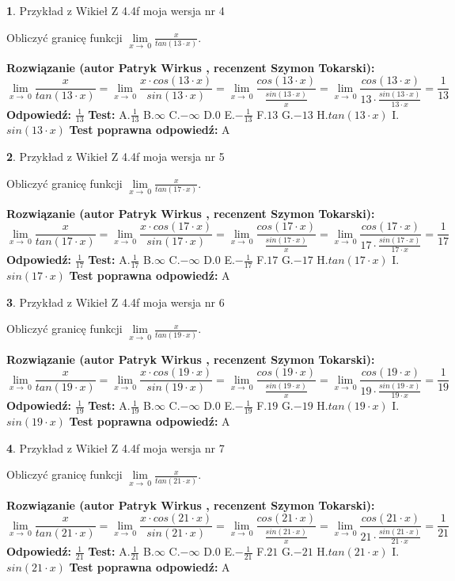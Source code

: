 \documentclass[12pt, a4paper]{article}
\theoremstyle{definition} %
\newtheorem{zad}{}
\newcommand{\zadStart}[1]{\begin{zad}#1\newline}
\newcommand{\zadStop}{\end{zad}}
\newcommand{\rozwStart}[2]{\noindent \textbf{Rozwiązanie (autor #1 , recenzent #2): }\newline}
\newcommand{\rozwStop}{\newline}
\newcommand{\odpStart}{\noindent \textbf{Odpowiedź:}\newline}
\newcommand{\odpStop}{\newline}
\newcommand{\testStart}{\noindent \textbf{Test:}\newline}
\newcommand{\testStop}{\newline}
\newcommand{\kluczStart}{\noindent \textbf{Test poprawna odpowiedź:}\newline}
\newcommand{\kluczStop}{\newline}
\begin{document}
\zadStart{Przykład z Wikieł Z 4.4f moja wersja nr 4}


Obliczyć granicę funkcji $\lim\limits_{x\to\ 0}\frac{x}{tan(13 \cdot x)}$.
\zadStop
\rozwStart{Patryk Wirkus}{Szymon Tokarski}
$$\lim\limits_{x\to\ 0}\frac{x}{tan(13 \cdot x)}=\lim\limits_{x\to\ 0}\frac{x \cdot cos(13 \cdot x)}{sin(13 \cdot x)}=\lim\limits_{x\to\ 0}\frac{cos(13 \cdot x)}{\frac{sin(13 \cdot x)}{x}}=\lim\limits_{x\to\ 0}\frac{cos(13 \cdot x)}{13 \cdot \frac{sin(13 \cdot x)}{13 \cdot x}} = \frac{1}{13}$$
\rozwStop
\odpStart
$\frac{1}{13}$
\odpStop
\testStart
A.$\frac{1}{13}$
B.$\infty$
C.$-\infty$
D.$0$
E.$-\frac{1}{13}$
F.$13$
G.$-13$
H.$tan(13 \cdot x)$
I.$sin(13 \cdot x)$
\testStop
\kluczStart
A
\kluczStop



\zadStart{Przykład z Wikieł Z 4.4f moja wersja nr 5}


Obliczyć granicę funkcji $\lim\limits_{x\to\ 0}\frac{x}{tan(17 \cdot x)}$.
\zadStop
\rozwStart{Patryk Wirkus}{Szymon Tokarski}
$$\lim\limits_{x\to\ 0}\frac{x}{tan(17 \cdot x)}=\lim\limits_{x\to\ 0}\frac{x \cdot cos(17 \cdot x)}{sin(17 \cdot x)}=\lim\limits_{x\to\ 0}\frac{cos(17 \cdot x)}{\frac{sin(17 \cdot x)}{x}}=\lim\limits_{x\to\ 0}\frac{cos(17 \cdot x)}{17 \cdot \frac{sin(17 \cdot x)}{17 \cdot x}} = \frac{1}{17}$$
\rozwStop
\odpStart
$\frac{1}{17}$
\odpStop
\testStart
A.$\frac{1}{17}$
B.$\infty$
C.$-\infty$
D.$0$
E.$-\frac{1}{17}$
F.$17$
G.$-17$
H.$tan(17 \cdot x)$
I.$sin(17 \cdot x)$
\testStop
\kluczStart
A
\kluczStop



\zadStart{Przykład z Wikieł Z 4.4f moja wersja nr 6}


Obliczyć granicę funkcji $\lim\limits_{x\to\ 0}\frac{x}{tan(19 \cdot x)}$.
\zadStop
\rozwStart{Patryk Wirkus}{Szymon Tokarski}
$$\lim\limits_{x\to\ 0}\frac{x}{tan(19 \cdot x)}=\lim\limits_{x\to\ 0}\frac{x \cdot cos(19 \cdot x)}{sin(19 \cdot x)}=\lim\limits_{x\to\ 0}\frac{cos(19 \cdot x)}{\frac{sin(19 \cdot x)}{x}}=\lim\limits_{x\to\ 0}\frac{cos(19 \cdot x)}{19 \cdot \frac{sin(19 \cdot x)}{19 \cdot x}} = \frac{1}{19}$$
\rozwStop
\odpStart
$\frac{1}{19}$
\odpStop
\testStart
A.$\frac{1}{19}$
B.$\infty$
C.$-\infty$
D.$0$
E.$-\frac{1}{19}$
F.$19$
G.$-19$
H.$tan(19 \cdot x)$
I.$sin(19 \cdot x)$
\testStop
\kluczStart
A
\kluczStop



\zadStart{Przykład z Wikieł Z 4.4f moja wersja nr 7}


Obliczyć granicę funkcji $\lim\limits_{x\to\ 0}\frac{x}{tan(21 \cdot x)}$.
\zadStop
\rozwStart{Patryk Wirkus}{Szymon Tokarski}
$$\lim\limits_{x\to\ 0}\frac{x}{tan(21 \cdot x)}=\lim\limits_{x\to\ 0}\frac{x \cdot cos(21 \cdot x)}{sin(21 \cdot x)}=\lim\limits_{x\to\ 0}\frac{cos(21 \cdot x)}{\frac{sin(21 \cdot x)}{x}}=\lim\limits_{x\to\ 0}\frac{cos(21 \cdot x)}{21 \cdot \frac{sin(21 \cdot x)}{21 \cdot x}} = \frac{1}{21}$$
\rozwStop
\odpStart
$\frac{1}{21}$
\odpStop
\testStart
A.$\frac{1}{21}$
B.$\infty$
C.$-\infty$
D.$0$
E.$-\frac{1}{21}$
F.$21$
G.$-21$
H.$tan(21 \cdot x)$
I.$sin(21 \cdot x)$
\testStop
\kluczStart
A
\kluczStop
\end{document}
